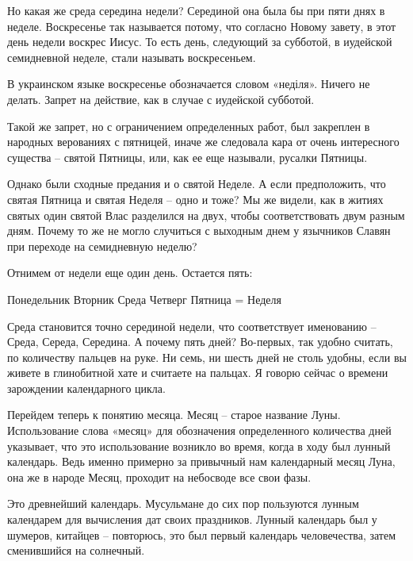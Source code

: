 \documentclass[a5paper,11pt,openany]{article}
\begin{document}
  Но какая же среда середина недели? Серединой она была бы при пяти днях в неделе. Воскресенье так называется потому, что согласно Новому завету, в этот день недели воскрес Иисус. То есть день, следующий за субботой, в иудейской семидневной неделе, стали называть воскресеньем.

  В украинском языке воскресенье обозначается словом «неділя». Ничего не делать. Запрет на действие, как в случае с иудейской субботой.

   Такой же запрет, но с ограничением определенных работ, был закреплен в народных верованиях с пятницей, иначе же следовала кара от очень интересного существа – святой Пятницы, или, как ее еще называли, русалки Пятницы.

 Однако были сходные предания и о святой Неделе. А если предположить, что святая Пятница и святая Неделя – одно и тоже? Мы же видели, как в житиях святых один святой Влас разделился на двух, чтобы соответствовать двум разным дням. Почему то же не могло случиться с выходным днем у язычников Славян при переходе на семидневную неделю?

Отнимем от недели еще один день. Остается пять:\newline 

\noindent Понедельник\newline
Вторник\newline
Среда\newline
Четверг\newline
Пятница = Неделя\newline

Среда становится точно серединой недели, что соответствует именованию – Среда, Середа, Середина. А почему пять дней? Во-первых, так удобно считать, по количеству пальцев на руке. Ни семь, ни шесть дней не столь удобны, если вы живете в глинобитной хате и считаете на пальцах. Я говорю сейчас о времени зарождении календарного цикла.

  Перейдем теперь к понятию месяца. Месяц – старое название Луны. Использование слова «месяц» для обозначения определенного количества дней указывает, что это использование возникло во время, когда в ходу был лунный календарь. Ведь именно примерно за привычный нам календарный месяц Луна, она же в народе Месяц, проходит на небосводе все свои фазы.

   Это древнейший календарь. Мусульмане до сих пор пользуются лунным календарем для вычисления дат своих праздников. Лунный календарь был у шумеров, китайцев – повторюсь, это был первый календарь человечества, затем сменившийся на солнечный.
\end{document}
